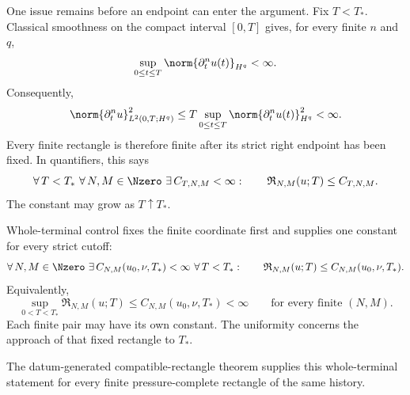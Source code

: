 One issue remains before an endpoint can enter the argument.
Fix \(T<T_*\).
Classical smoothness on the compact interval \([0,T]\) gives, for every finite \(n\) and \(q\),
\[
  \sup_{0\leq t\leq T}
  \norm{\partial_t^n u(t)}_{H^q}
  <
  \infty.
\]
Consequently,
\[
  \norm{\partial_t^n u}_{L^2(0,T;H^q)}^2
  \leq
  T
  \sup_{0\leq t\leq T}
  \norm{\partial_t^n u(t)}_{H^q}^2
  <
  \infty.
\]
Every finite rectangle is therefore finite after its strict right endpoint has been fixed.
In quantifiers, this says
\[
  \forall\,T<T_*
  \ \forall\,N,M\in\Nzero
  \ \exists\,C_{T,N,M}<\infty:
  \qquad
  \mathfrak R_{N,M}(u;T)
  \leq
  C_{T,N,M}.
\]
The constant may grow as \(T\uparrow T_*\).

Whole-terminal control fixes the finite coordinate first and supplies one constant for every strict cutoff:
\[
  \forall\,N,M\in\Nzero
  \ \exists\,C_{N,M}(u_0,\nu,T_*)<\infty
  \ \forall\,T<T_*:
  \qquad
  \mathfrak R_{N,M}(u;T)
  \leq
  C_{N,M}(u_0,\nu,T_*).
\]
Equivalently,
\[
  \sup_{0<T<T_*}
  \mathfrak R_{N,M}(u;T)
  \leq
  C_{N,M}(u_0,\nu,T_*)
  <
  \infty
  \qquad
  \text{for every finite }(N,M).
\]
Each finite pair may have its own constant.
The uniformity concerns the approach of that fixed rectangle to \(T_*\).

The datum-generated compatible-rectangle theorem supplies this whole-terminal statement for every finite pressure-complete rectangle of the same history.
